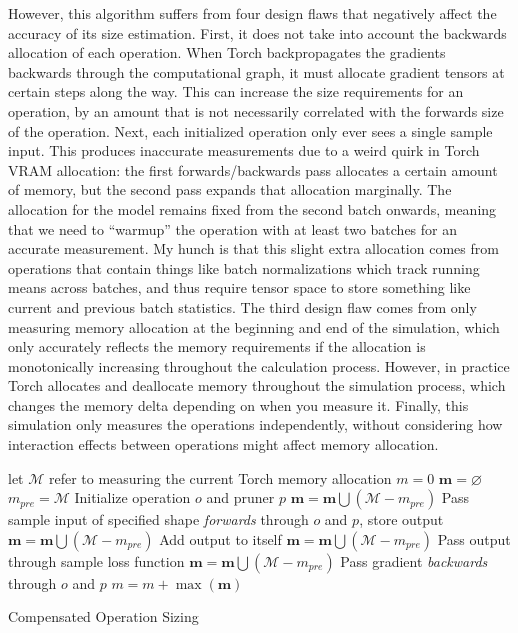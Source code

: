 However, this algorithm suffers from four design flaws that negatively affect the accuracy of its size estimation.
First, it does not take into account the backwards allocation of each operation. When Torch backpropagates the
gradients backwards through the computational graph, it must allocate gradient tensors at certain steps along the way. This
can increase the size requirements for an operation, by an amount that is not necessarily correlated with the forwards
size of the operation. Next, each initialized operation only ever sees a single sample input. This produces
inaccurate measurements due to a weird quirk in Torch VRAM allocation: the first forwards/backwards pass allocates a
certain amount of memory, but the second pass expands that allocation marginally. The allocation for the model remains
fixed from the second batch onwards, meaning that we need to ``warmup'' the operation with at least two batches for an accurate measurement.
My hunch is that this slight extra allocation comes from operations that contain things like batch normalizations which track running means across batches,
and thus require tensor space to store something like current and previous batch statistics. The third design flaw comes
from only measuring memory allocation at the beginning and end of the simulation, which only accurately reflects the memory
requirements if the allocation is monotonically increasing throughout the calculation process. However, in practice Torch allocates and deallocate memory
throughout the simulation process, which changes the memory delta depending on when you measure it. Finally, this
simulation only measures the operations independently, without considering how interaction effects between operations might affect
memory allocation.

\begin{algorithm}
	\SetAlgoLined
	let $\mathcal{M}$ refer to measuring the current Torch memory allocation\;
	$m = 0$\;
	 {
		$\mathbf{m} = \varnothing$\;
		$m_{pre} = \mathcal{M}$\;
		Initialize operation $o$ and pruner $p$\;
		 {
			$\mathbf{m} = \mathbf{m} \bigcup (\mathcal{M} - m_{pre})$\;
			Pass sample input of specified shape \textit{forwards} through $o$ and $p$, store output\;
			$\mathbf{m} = \mathbf{m} \bigcup (\mathcal{M} - m_{pre})$\;
			Add output to itself\;
			$\mathbf{m} = \mathbf{m} \bigcup (\mathcal{M} - m_{pre})$\;
			Pass output through sample loss function\;
			$\mathbf{m} = \mathbf{m} \bigcup (\mathcal{M} - m_{pre})$\;
			Pass gradient \textit{backwards} through $o$ and $p$\;
		}
		$m = m + \max(\mathbf{m})$
	}
	\caption{Compensated Operation Sizing}
	\label{alg:revised_operation_sizing}
\end{algorithm}

